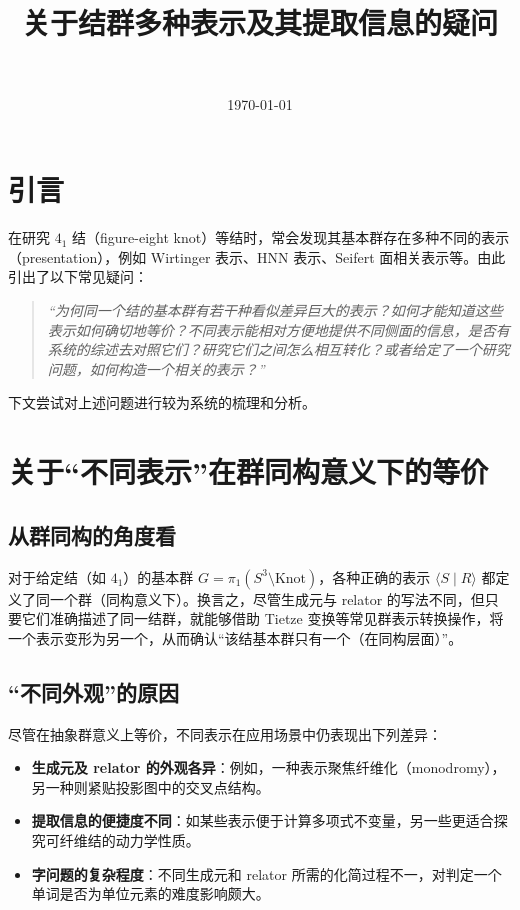 \documentclass[12pt]{article}
\begin{document}
\title{关于结群多种表示及其提取信息的疑问}
\author{~}
\date{\today}

\maketitle

\section*{引言}
在研究 $4_1$ 结（figure-eight knot）等结时，常会发现其基本群存在多种不同的表示（presentation），例如 Wirtinger 表示、HNN 表示、Seifert 面相关表示等。由此引出了以下常见疑问：

\begin{quotation}
\emph{“为何同一个结的基本群有若干种看似差异巨大的表示？如何才能知道这些表示如何确切地等价？不同表示能相对方便地提供不同侧面的信息，是否有系统的综述去对照它们？研究它们之间怎么相互转化？或者给定了一个研究问题，如何构造一个相关的表示？”}
\end{quotation}

下文尝试对上述问题进行较为系统的梳理和分析。

\section{关于“不同表示”在群同构意义下的等价}
\subsection{从群同构的角度看}
对于给定结（如 $4_1$）的基本群 $G=\pi_1(S^3\setminus \mathrm{Knot})$，各种正确的表示 $\langle S \mid R\rangle$ 都定义了同一个群（同构意义下）。换言之，尽管生成元与 relator 的写法不同，但只要它们准确描述了同一结群，就能够借助 Tietze 变换等常见群表示转换操作，将一个表示变形为另一个，从而确认“该结基本群只有一个（在同构层面）”。

\subsection{“不同外观”的原因}
尽管在抽象群意义上等价，不同表示在应用场景中仍表现出下列差异：
\begin{itemize}
    \item \textbf{生成元及 relator 的外观各异}：例如，一种表示聚焦纤维化（monodromy），另一种则紧贴投影图中的交叉点结构。
    \item \textbf{提取信息的便捷度不同}：如某些表示便于计算多项式不变量，另一些更适合探究可纤维结的动力学性质。
    \item \textbf{字问题的复杂程度}：不同生成元和 relator 所需的化简过程不一，对判定一个单词是否为单位元素的难度影响颇大。
\end{itemize}
\end{document}
